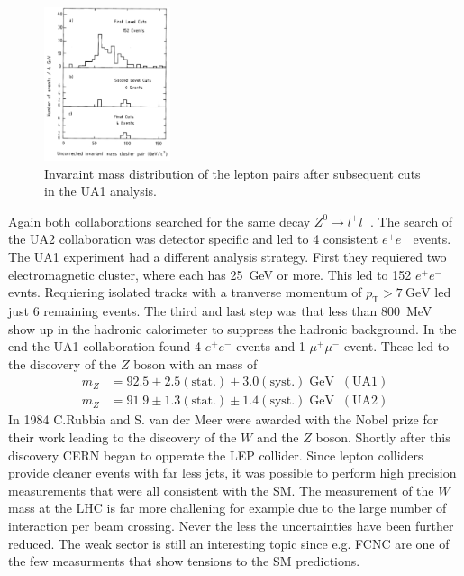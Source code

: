 \begin{figure}
    \includegraphics[width=0.33\textwidth]{graphics/Z.png}
    \caption{Invaraint mass distribution of the lepton pairs after subsequent cuts in the UA1 analysis.\cite{wz}}
		\label{fig:Z}
  \end{figure}
  \FloatBarrier
Again both collaborations searched for the same decay $Z^0 \rightarrow l^+l^-$. The search of the UA2 collaboration was detector specific and led to 4 consistent $e^+e^-$ events. The UA1 experiment had a different analysis strategy. First they requiered two electromagnetic cluster, where each has \SI{25}{\GeV} or more. This led to 152 $e^+e^-$ evnts. Requiering isolated tracks with a tranverse momentum of $p_{\text{T}}>\SI{7}{\GeV}$ led just 6 remaining events. The third and last step was that less than \SI{800}{\MeV} show up in the hadronic calorimeter to suppress the hadronic background. In the end the UA1 collaboration found 4 $e^+e^-$ events and 1 $\mu^+\mu^-$ event. These led to the discovery of the $Z$ boson with an mass of
\begin{align*}
	m_Z &= 92.5 \pm 2.5(\text{stat.})\pm 3.0(\text{syst.})\;\si{\GeV} \;\; (\text{UA1})\\
	m_Z &= 91.9 \pm 1.3(\text{stat.})\pm 1.4(\text{syst.})\;\si{\GeV} \;\; (\text{UA2})
\end{align*}
In 1984 C.Rubbia and S. van der Meer were awarded with the Nobel prize for their work leading to the discovery of the $W$ and the $Z$ boson.
Shortly after this discovery CERN began to opperate the LEP collider. Since lepton colliders provide cleaner events with far less jets, it was possible to perform high precision measurements that were all consistent with the SM. The measurement of the $W$ mass at the LHC is far more challening for example due to the large number of interaction per beam crossing. Never the less the uncertainties have been further reduced. The weak sector is still an interesting topic since e.g. FCNC are one of the few measurments that show tensions to the SM predictions.
